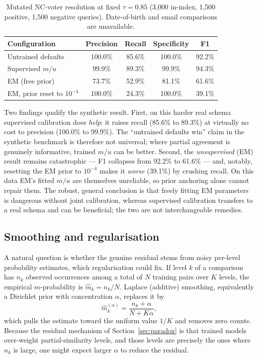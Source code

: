 \documentclass[conference]{IEEEtran}
\begin{document}
\begin{table}[t]
\centering
\caption{Mutated NC-voter resolution at fixed $\tau=0.85$ (3{,}000 in-index, 1{,}500
positive, 1{,}500 negative queries). Date-of-birth and email comparisons are unavailable.}
\label{tab:real}
\begin{tabular}{lcccc}
\toprule
Configuration & Precision & Recall & Specificity & F1 \\
\midrule
Untrained defaults & 100.0\% & 85.6\% & 100.0\% & 92.2\% \\
Supervised $m/u$ & 99.9\% & 89.3\% & 99.9\% & 94.3\% \\
EM (free prior) & 73.7\% & 52.9\% & 81.1\% & 61.6\% \\
EM, prior reset to $10^{-4}$ & 100.0\% & 24.3\% & 100.0\% & 39.1\% \\
\bottomrule
\end{tabular}
\end{table}

Two findings qualify the synthetic result. First, on this harder real schema supervised
calibration does \emph{help}: it raises recall (85.6\% to 89.3\%) at virtually no cost to
precision (100.0\% to 99.9\%). The ``untrained defaults win'' claim in the synthetic
benchmark is therefore not universal; where partial agreement is genuinely informative,
trained $m/u$ can be better. Second, the \emph{unsupervised} (EM) result remains
catastrophic --- F1 collapses from 92.2\% to 61.6\% --- and, notably, resetting the EM prior
to $10^{-4}$ makes it \emph{worse} (39.1\%) by crushing recall. On this data EM's fitted
$m/u$ are themselves unreliable, so prior anchoring alone cannot repair them. The robust,
general conclusion is that freely fitting EM parameters is dangerous without joint
calibration, whereas supervised calibration transfers to a real schema and can be
beneficial; the two are not interchangeable remedies.

\subsection{Smoothing and regularisation}
\label{sec:smoothing}
A natural question is whether the genuine residual stems from noisy per-level probability
estimates, which regularisation could fix. If level $k$ of a comparison has $n_k$ observed
occurrences among a total of $N$ training pairs over $K$ levels, the empirical
$m$-probability is $\hat m_k=n_k/N$. Laplace (additive) smoothing, equivalently a Dirichlet
prior with concentration $\alpha$, replaces it by
\begin{equation}
\hat m_k^{(\alpha)}=\frac{n_k+\alpha}{N+K\alpha},
\end{equation}
which pulls the estimate toward the uniform value $1/K$ and removes zero counts. Because the
residual mechanism of Section~\ref{sec:paradox} is that trained models over-weight
partial-similarity levels, and those levels are precisely the ones where $n_k$ is large, one
might expect larger $\alpha$ to reduce the residual.
\end{document}
